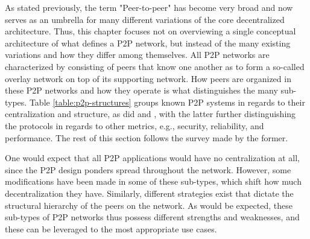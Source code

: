     As stated previously, the term "Peer-to-peer" has become very broad and now serves as an umbrella for many different variations of the core decentralized architecture.
    Thus, this chapter focuses not on overviewing a single conceptual architecture of what defines a P2P network, but instead of the many existing variations and how they differ among themselves.
    All P2P networks are characterized by consisting of peers that know one another as to form a so-called overlay network on top of its supporting network.
    How peers are organized in these P2P networks and how they operate is what distinguishes the many sub-types.
    Table \ref{table:p2p-structures} groups known P2P systems in regards to their centralization and structure, as did \cite{p2p-survey-1} and \cite{p2p-survey-2}, with the latter further distinguishing the protocols in regards to other metrics, e.g., security, reliability, and performance.
    The rest of this section follows the survey made by the former.


    One would expect that all P2P applications would have no centralization at all, since the P2P design ponders  spread throughout the network.
    However, some modifications have been made in some of these sub-types, which shift how much decentralization they have.
    Similarly, different strategies exist that dictate the structural hierarchy of the peers on the network.
    As would be expected, these sub-types of P2P networks thus possess different strengths and weaknesses, and these can be leveraged to the most appropriate use cases.

